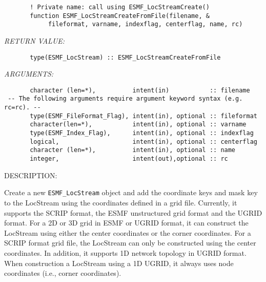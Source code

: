   \label{locstream:createfromfile}
\begin{verbatim}       ! Private name: call using ESMF_LocStreamCreate()
       function ESMF_LocStreamCreateFromFile(filename, &
            fileformat, varname, indexflag, centerflag, name, rc)\end{verbatim}{\em RETURN VALUE:}
\begin{verbatim}       type(ESMF_LocStream) :: ESMF_LocStreamCreateFromFile
 \end{verbatim}{\em ARGUMENTS:}
\begin{verbatim}       character (len=*),          intent(in)           :: filename
 -- The following arguments require argument keyword syntax (e.g. rc=rc). --
       type(ESMF_FileFormat_Flag), intent(in), optional :: fileformat
       character(len=*),           intent(in), optional :: varname
       type(ESMF_Index_Flag),      intent(in), optional :: indexflag
       logical,                    intent(in), optional :: centerflag
       character (len=*),          intent(in), optional :: name
       integer,                    intent(out),optional :: rc
 \end{verbatim}
{\sf DESCRIPTION:\\ }


       Create a new {\tt ESMF\_LocStream} object and add the coordinate keys and mask key
       to the LocStream using the coordinates defined in a grid file.  Currently, it 
       supports the SCRIP format, the ESMF unstructured grid format and the UGRID format.
       For a 2D or 3D grid in ESMF or UGRID format, it can construct the LocStream using either 
       the center coordinates or the corner coordinates.  For a SCRIP format grid file, the
       LocStream can only be constructed using the center coordinates.  In
       addition, it supports 1D network topology in UGRID format.  When
       construction a LocStream using a 1D UGRID, it always uses node
       coordinates (i.e., corner coordinates). 
  
